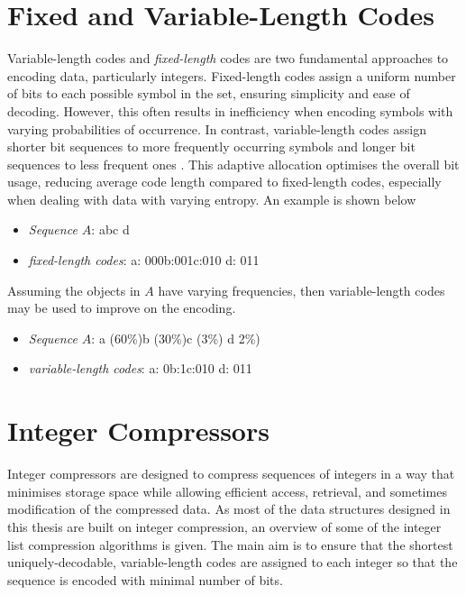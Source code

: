\section{Fixed and Variable-Length Codes}
Variable-length codes and \textit{fixed-length} codes are two fundamental approaches to encoding data, particularly integers. Fixed-length codes assign a uniform number of bits to each possible symbol in the set, ensuring simplicity and ease of decoding. However, this often results in inefficiency when encoding symbols with varying probabilities of occurrence. In contrast, variable-length codes assign shorter bit sequences to more frequently occurring symbols and longer bit sequences to less frequent ones \cite{Navarro_2016}. This adaptive allocation optimises the overall bit usage, reducing average code length compared to fixed-length codes, especially when dealing with data with varying entropy. An example is shown below
\begin{itemize}
    \item \textit{Sequence $A$}:\hspace{1.68cm} a\quad b\quad c \quad d
    \item \textit{fixed-length codes}: \hspace{0.5cm} a: 000\quad b:001\quad c:010 \quad d: 011  
\end{itemize}
Assuming the objects in $A$ have varying frequencies, then variable-length codes may be used to improve on the encoding.
\begin{itemize}
    \item \textit{Sequence $A$}:\hspace{1.68cm} a (60\%)\quad b (30\%)\quad c (3\%) \quad d 2\%)
    \item \textit{variable-length codes}: \hspace{0.5cm} a: 0\quad b:1\quad c:010 \quad d: 011  
\end{itemize}
\section{Integer Compressors}
\label{int-compressors}
Integer compressors are designed to compress sequences of integers in a way that minimises storage space while allowing efficient access, retrieval, and sometimes modification of the compressed data. As most of the data structures designed in this thesis are built on integer compression, an overview of some of the integer list compression algorithms is given. The main aim is to ensure that the shortest uniquely-decodable, variable-length codes are assigned to each integer so that the sequence is encoded with minimal number of bits.
